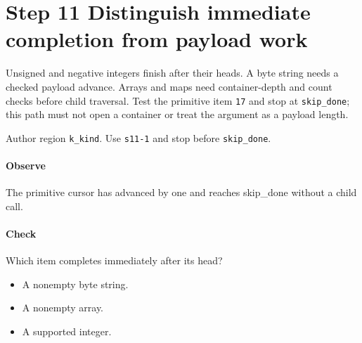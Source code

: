 \section{Step 11 Distinguish immediate completion from payload work}\label{cbor-s11}
Unsigned and negative integers finish after their heads. A byte string needs a checked payload advance. Arrays and maps need container-depth and count checks before child traversal. Test the primitive item \texttt{17} and stop at \texttt{skip\_done}; this path must not open a container or treat the argument as a payload length.

Author region \texttt{k\_kind}. Use \texttt{s11-1} and stop before \texttt{skip\_done}.

\paragraph{Observe} The primitive cursor has advanced by one and reaches skip\_done without a child call.

\paragraph{Check} Which item completes immediately after its head?
\begin{itemize}
\item[A.] A nonempty byte string.
\item[B.] A nonempty array.
\item[C.] A supported integer.
\end{itemize}
